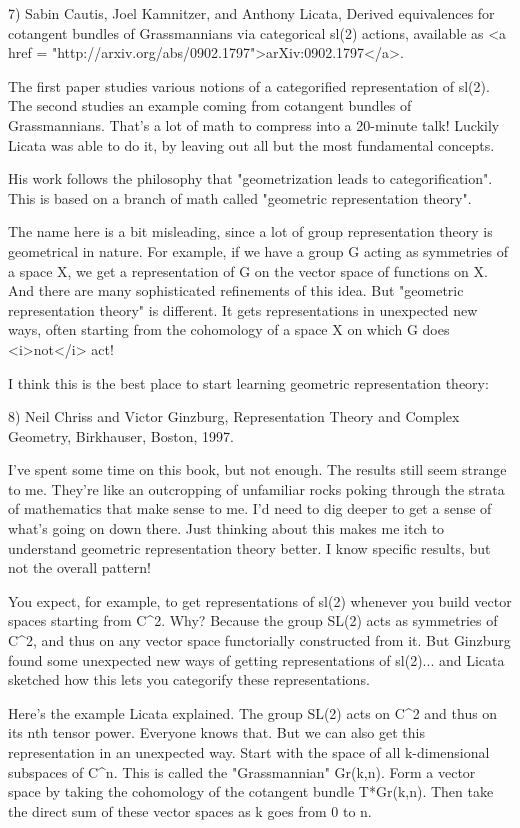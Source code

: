 7) Sabin Cautis, Joel Kamnitzer, and Anthony Licata, Derived
equivalences for cotangent bundles of Grassmannians via categorical
sl(2) actions, available as 
<a href = "http://arxiv.org/abs/0902.1797">arXiv:0902.1797</a>.

The first paper studies various notions of a categorified
representation of sl(2).  The second studies an example coming from
cotangent bundles of Grassmannians.  That's a lot of math to compress
into a 20-minute talk!  Luckily Licata was able to do it, by leaving
out all but the most fundamental concepts.

His work follows the philosophy that "geometrization leads to
categorification".  This is based on a branch of math called
"geometric representation theory".  

The name here is a bit misleading, since a lot of group representation
theory is geometrical in nature.  For example, if we have a group G
acting as symmetries of a space X, we get a representation of G on the
vector space of functions on X.  And there are many sophisticated
refinements of this idea.  But "geometric representation
theory" is different.  It gets representations in unexpected new
ways, often starting from the cohomology of a space X on which G does
<i>not</i> act!

I think this is the best place to start learning geometric
representation theory:

8) Neil Chriss and Victor Ginzburg, Representation Theory and Complex
Geometry, Birkhauser, Boston, 1997.

I've spent some time on this book, but not enough.  The results still
seem strange to me.  They're like an outcropping of unfamiliar rocks
poking through the strata of mathematics that make sense to me.  I'd
need to dig deeper to get a sense of what's going on down there.  Just
thinking about this makes me itch to understand geometric
representation theory better.  I know specific results, but not the
overall pattern!

You expect, for example, to get representations of sl(2) whenever you
build vector spaces starting from C^{2}.  Why?  Because the
group SL(2) acts as symmetries of C^{2}, and thus on any
vector space functorially constructed from it.  But Ginzburg found
some unexpected new ways of getting representations of sl(2)... and
Licata sketched how this lets you categorify these representations.

Here's the example Licata explained.  The group SL(2) acts on
C^{2} and thus on its nth tensor power.  Everyone knows that.
But we can also get this representation in an unexpected way.  Start
with the space of all k-dimensional subspaces of C^{n}.  This
is called the "Grassmannian" Gr(k,n).  Form a vector space
by taking the cohomology of the cotangent bundle T*Gr(k,n).  Then take
the direct sum of these vector spaces as k goes from 0 to n.

